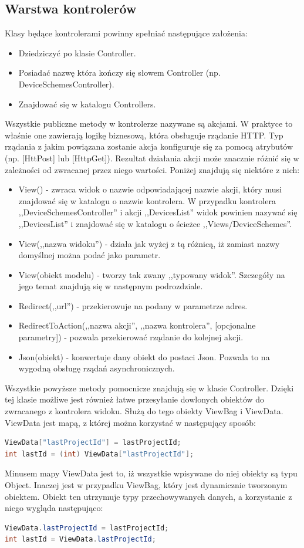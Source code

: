 \subsection{Warstwa kontrolerów}
Klasy będące kontrolerami powinny spełniać następujące założenia:
\begin{itemize}
\item Dziedziczyć po klasie Controller. 
\item Posiadać nazwę która kończy się słowem Controller (np. DeviceSchemesController).
\item Znajdować się w katalogu Controllers.
\end{itemize}
Wszystkie publiczne metody w kontrolerze nazywane są akcjami. W praktyce to właśnie one zawierają logikę biznesową, która obsługuje rządanie HTTP. Typ rządania z jakim powiązana zostanie akcja konfiguruje się za pomocą atrybutów (np. [HttPost] lub [HttpGet]). Rezultat działania akcji może znacznie różnić się w zależności od zwracanej przez niego wartości. Poniżej znajdują się niektóre z nich:
\begin{itemize}
\item View() - zwraca widok o nazwie odpowiadającej nazwie akcji, który musi znajdować się w katalogu o nazwie kontrolera. W przypadku kontrolera ,,DeviceSchemesController'' i akcji ,,DevicesList'' widok powinien nazywać się ,,DevicesList'' i znajdować się w katalogu o ścieżce ,,Views/DeviceSchemes''.
\item View(,,nazwa widoku'') - działa jak wyżej z tą różnicą, iż zamiast nazwy domyślnej można podać jako parametr.
\item View(obiekt modelu) - tworzy tak zwany ,,typowany widok''. Szczegóły na jego temat znajdują się w następnym podrozdziale.
\item Redirect(,,url'') - przekierowuje na podany w parametrze adres.
\item RedirectToAction(,,nazwa akcji'', ,,nazwa kontrolera'', [opcjonalne parametry]) - pozwala przekierować rządanie do kolejnej akcji.
\item Json(obiekt) - konwertuje dany obiekt do postaci Json. Pozwala to na wygodną obsługę rządań asynchronicznych.
\end{itemize}
Wszystkie powyższe metody pomocnicze znajdują się w klasie Controller. Dzięki tej klasie możliwe jest również łatwe przesyłanie dowlonych obiektów do zwracanego z kontrolera widoku. Służą do tego obiekty ViewBag i ViewData. ViewData jest mapą, z której można korzystać w następujący sposób:
\begin{lstlisting}[language=Java]
ViewData["lastProjectId"] = lastProjectId;
int lastId = (int) ViewData["lastProjectId"];
\end{lstlisting}
Minusem mapy ViewData jest to, iż wszystkie wpisywane do niej obiekty są typu Object.
Inaczej jest w przypadku ViewBag, który jest dynamicznie tworzonym obiektem.  Obiekt ten utrzymuje typy przechowywanych danych, a korzystanie z niego wygląda następująco:
\begin{lstlisting}[language=Java]
ViewData.lastProjectId = lastProjectId;
int lastId = ViewData.lastProjectId;
\end{lstlisting}

